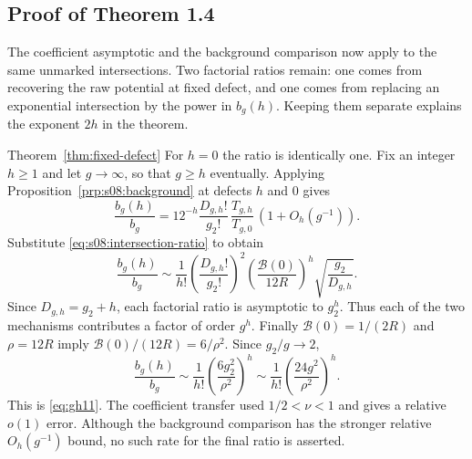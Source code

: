\subsection{Proof of Theorem 1.4}
\label{subsec:s08:06}

The coefficient asymptotic and the background comparison now apply
to the same unmarked intersections. Two factorial ratios remain:
one comes from recovering the raw potential at fixed defect, and
one comes from replacing an exponential intersection by the power
in $b_g(h)$. Keeping them separate explains the exponent $2h$ in
the theorem.

\begin{prfn}{Theorem~\ref{thm:fixed-defect}}
For $h=0$ the ratio is identically one. Fix an integer $h\geq1$
and let $g\to\infty$, so that $g\geq h$ eventually. Applying
Proposition~\ref{prp:s08:background} at defects $h$ and $0$ gives
\begin{equation}\label{eq:s08:final-factorials}
 \frac{b_g(h)}{b_g}
 =12^{-h}\frac{D_{g,h}!}{g_2!}\,
            \frac{T_{g,h}}{T_{g,0}}\,(1+O_h(g^{-1})).
\end{equation}
Substitute \eqref{eq:s08:intersection-ratio} to obtain
\begin{equation}\label{eq:s08:combined-ratio}
 \frac{b_g(h)}{b_g}
 \sim \frac1{h!}
       \left(\frac{D_{g,h}!}{g_2!}\right)^2
       \left(\frac{\mathcal B(0)}{12R}\right)^h
       \sqrt{\frac{g_2}{D_{g,h}}}.
\end{equation}
Since $D_{g,h}=g_2+h$, each factorial ratio is asymptotic to
$g_2^h$. Thus each of the two mechanisms contributes a factor
of order $g^h$. Finally
$\mathcal B(0)=1/(2R)$ and $\rho=12R$ imply
$\mathcal B(0)/(12R)=6/\rho^2$. Since $g_2/g\to2$,
\[
 \frac{b_g(h)}{b_g}
 \sim \frac1{h!}\left(\frac{6g_2^2}{\rho^2}\right)^h
 \sim \frac1{h!}\left(\frac{24g^2}{\rho^2}\right)^h.
\]
This is \eqref{eq:gh11}. The coefficient transfer used
$1/2<\nu<1$ and gives a relative $o(1)$ error. Although the
background comparison has the stronger relative
$O_h(g^{-1})$ bound, no such rate for the final ratio is asserted.
\end{prfn}

